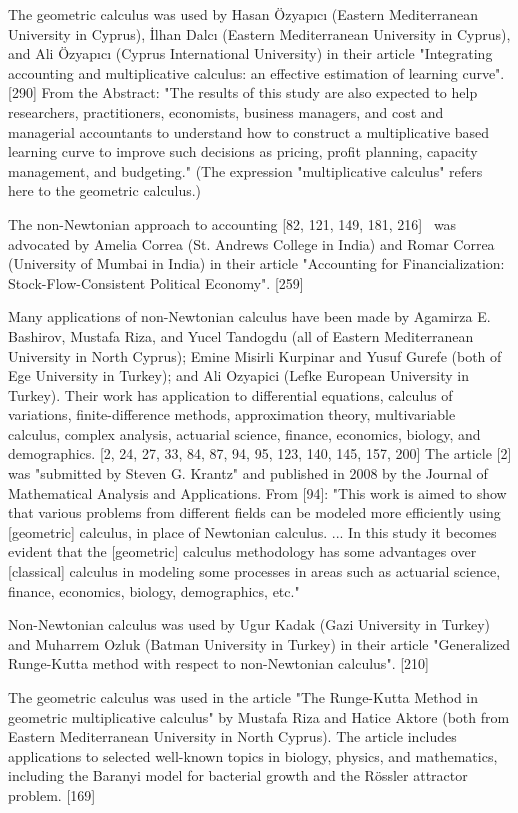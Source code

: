 \documentclass[12pt]{article}
\begin{document}
The geometric calculus was used by Hasan Özyapıcı (Eastern Mediterranean University in Cyprus), İlhan Dalcı (Eastern Mediterranean University in Cyprus), and Ali Özyapıcı (Cyprus International University) in their article "Integrating accounting and multiplicative calculus: an effective estimation of learning curve". [290] From the Abstract: "The results of this study are also expected to help researchers, practitioners, economists, business managers, and cost and managerial accountants to understand how to construct a multiplicative based learning curve to improve such decisions as pricing, profit planning, capacity management, and budgeting." (The expression "multiplicative calculus" refers here to the geometric calculus.)

The non-Newtonian approach to accounting [82, 121, 149, 181, 216]  was advocated by Amelia Correa (St. Andrews College in India) and Romar Correa (University of Mumbai in India) in their article "Accounting for Financialization: Stock-Flow-Consistent Political Economy". [259]

Many applications of non-Newtonian calculus have been made by Agamirza E. Bashirov, Mustafa Riza, and Yucel Tandogdu (all of Eastern Mediterranean University in North Cyprus); Emine Misirli Kurpinar and Yusuf Gurefe (both of Ege University in Turkey); and Ali Ozyapici (Lefke European University in Turkey). Their work has application to differential equations, calculus of variations, finite-difference methods, approximation theory, multivariable calculus, complex analysis, actuarial science, finance, economics, biology, and demographics. [2, 24, 27, 33, 84, 87, 94, 95, 123, 140, 145, 157, 200] The article [2] was "submitted by Steven G. Krantz" and published in 2008 by the Journal of Mathematical Analysis and Applications. From [94]: "This work is aimed to show that various problems from different fields can be modeled more efficiently using [geometric] calculus, in place of Newtonian calculus. ... In this study it becomes evident that the [geometric] calculus methodology has some advantages over [classical] calculus in modeling some processes in areas such as actuarial science, finance, economics, biology, demographics, etc."

Non-Newtonian calculus was used by Ugur Kadak (Gazi University in Turkey) and Muharrem Ozluk (Batman University in Turkey) in their article "Generalized Runge-Kutta method with respect to non-Newtonian calculus". [210]

The geometric calculus was used in the article "The Runge-Kutta Method in geometric multiplicative calculus" by Mustafa Riza and Hatice Aktore (both from Eastern Mediterranean University in North Cyprus). The article includes applications to selected well-known topics in biology, physics, and mathematics, including the Baranyi model for bacterial growth and the Rössler attractor problem. [169]
\end{document}
